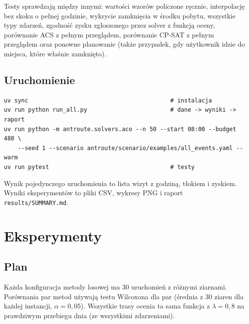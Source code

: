 \documentclass[11pt,a4paper]{article}
\begin{document}
Testy sprawdzają między innymi: wartości wzorów policzone ręcznie, interpolację bez skoku o pełnej godzinie, wykrycie zamknięcia w środku pobytu, wszystkie typy zdarzeń, zgodność zysku zgłoszonego przez solver z funkcją oceny, porównanie ACS z pełnym przeglądem, porównanie CP-SAT z pełnym przeglądem oraz ponowne planowanie (także przypadek, gdy użytkownik idzie do miejsca, które właśnie zamknięto).

\subsection{Uruchomienie}

\begin{verbatim}
uv sync                                         # instalacja
uv run python run_all.py                        # dane -> wyniki -> raport
uv run python -m antroute.solvers.aco --n 50 --start 08:00 --budget 480 \
    --seed 1 --scenario antroute/scenario/examples/all_events.yaml --warm
uv run pytest                                   # testy
\end{verbatim}

Wynik pojedynczego uruchomienia to lista wizyt z godziną, tłokiem i zyskiem. Wyniki eksperymentów to pliki CSV, wykresy PNG i raport \texttt{results/SUMMARY.md}.

\section{Eksperymenty}

\subsection{Plan}

Każda konfiguracja metody losowej ma 30 uruchomień z różnymi ziarnami. Porównania par metod używają testu Wilcoxona dla par (średnia z 30 ziaren dla każdej instancji, $\alpha = 0{,}05$). Wszystkie trasy ocenia ta sama funkcja z $\lambda = 0{,}8$ na prawdziwym przebiegu dnia (ze wszystkimi zdarzeniami).
\end{document}
